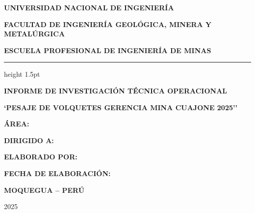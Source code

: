 \documentclass[11pt,a4paper]{article}
\begin{document}
\begin{titlepage}
    \centering
    {\bfseries\LARGE UNIVERSIDAD NACIONAL DE INGENIERÍA\par}
    \vspace{0.3cm}
    {\bfseries\large FACULTAD DE INGENIERÍA GEOLÓGICA, MINERA Y METALÚRGICA\par}
    \vspace{0.2cm}
    {\bfseries\large ESCUELA PROFESIONAL DE INGENIERÍA DE MINAS\par}
    \vspace{1.0cm}
    \hrule height 1.5pt
    \vspace{1.2cm}
    
    {\bfseries\Large INFORME DE INVESTIGACIÓN TÉCNICA OPERACIONAL\par}
    \vspace{1.2cm}
    
    {\bfseries\LARGE `PESAJE DE VOLQUETES GERENCIA MINA CUAJONE 2025''\par}
    \vspace{1.8cm}
    
    \begin{flushleft}
    \hspace{2.5cm}\textbf{\large ÁREA:}\\
    \hspace{2.5cm}{\normalsize Entrenamiento Mina / Operaciones Mina}\par
    \hspace{2.5cm}{\normalsize Superintendencia de Operaciones Mina Cuajone}\par
    \vspace{0.8cm}
    
    \hspace{2.5cm}\textbf{\large DIRIGIDO A:}\\
    \hspace{2.5cm}{\normalsize Superintendente de Operaciones Mina}\par
    \vspace{0.8cm}
    
    \hspace{2.5cm}\textbf{\large ELABORADO POR:}\\
    \hspace{2.5cm}{\normalsize Becario de Operaciones Mina}\par
    \vspace{0.8cm}
    
    \hspace{2.5cm}\textbf{\large FECHA DE ELABORACIÓN:}\\
    \hspace{2.5cm}{\normalsize 24 de Octubre del 2025}\par
    \end{flushleft}
    
    \vfill
    {\bfseries\large MOQUEGUA -- PERÚ\par}
    {\large 2025\par}
\end{titlepage}
\end{document}
